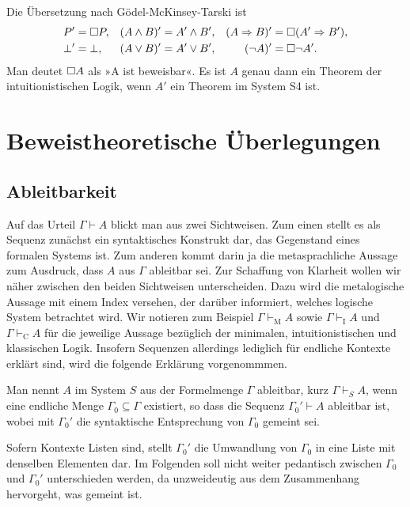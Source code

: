 Die Übersetzung nach Gödel-McKinsey-Tarski ist
\begin{align*}
P' &= \Box P, & (A\land B)' &= A'\land B', & (A\Rightarrow B)' &= \Box (A'\Rightarrow B'),\\
\bot' &= \bot, & (A\lor B)' &= A'\lor B', & (\lnot A)' &= \Box\lnot A'.
\end{align*}
Man deutet $\Box A$ als »A ist beweisbar«. Es ist $A$ genau
dann ein Theorem der intuitionistischen Logik, wenn $A'$ ein
Theorem im System S4 ist.

\section{Beweistheoretische Überlegungen}

\subsection{Ableitbarkeit}

Auf das Urteil $\Gamma\vdash A$ blickt man aus zwei Sichtweisen. Zum
einen stellt es als Sequenz zunächst ein syntaktisches Konstrukt dar,
das Gegenstand eines formalen Systems ist. Zum anderen kommt darin ja die
metasprachliche Aussage zum Ausdruck, dass $A$ aus $\Gamma$ ableitbar sei.
Zur Schaffung von Klarheit wollen wir näher zwischen den beiden Sichtweisen
unterscheiden. Dazu wird die metalogische Aussage mit einem Index versehen,
der darüber informiert, welches logische System betrachtet wird.
Wir notieren zum Beispiel $\Gamma\vdash_\mathrm{M} A$ sowie $\Gamma\vdash_\mathrm{I} A$
und $\Gamma\vdash_\mathrm{C} A$ für die jeweilige Aussage bezüglich der
minimalen, intuitionistischen und klassischen Logik. Insofern Sequenzen
allerdings lediglich für endliche Kontexte erklärt sind, wird die
folgende Erklärung vorgenommmen.

\begin{Definition}[Ableitbarkeit]\label{def:Ableitbarkeit}\newlinefirst
Man nennt $A$ im System $S$ aus der Formelmenge $\Gamma$
ableitbar, kurz $\Gamma\vdash_S A$, wenn eine endliche Menge
$\Gamma_0\subseteq\Gamma$ existiert, so dass die Sequenz $\Gamma_0'\vdash A$
ableitbar ist, wobei mit $\Gamma_0'$ die syntaktische Entsprechung von
$\Gamma_0$ gemeint sei.
\end{Definition}

\noindent
Sofern Kontexte Listen sind, stellt $\Gamma_0'$ die Umwandlung von
$\Gamma_0$ in eine Liste mit denselben Elementen dar. Im Folgenden
soll nicht weiter pedantisch zwischen $\Gamma_0$ und $\Gamma_0'$
unterschieden werden, da unzweideutig aus dem Zusammenhang hervorgeht,
was gemeint ist.

